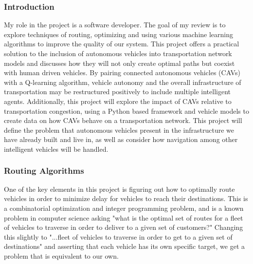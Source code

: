 \documentclass[onecolumn, draftclsnofoot,10pt, compsoc]{IEEEtran}
\begin{document}
\subsubsection{Introduction}
My role in the project is a software developer.
The goal of my review is to explore techniques of routing, optimizing and using various machine learning algorithms to improve the quality of our system.
This project offers a practical solution to the inclusion of autonomous vehicles into transportation network models and discusses how they will not only create optimal paths but coexist with human driven vehicles.
By pairing connected autonomous vehicles (CAVs) with a Q-learning algorithm, vehicle autonomy and the overall infrastructure of transportation may be restructured positively to include multiple intelligent agents.
Additionally, this project will explore the impact of CAVs relative to transportation congestion, using a Python based framework and vehicle models to create data on how CAVs behave on a transportation network.
This project will define the problem that autonomous vehicles present in the infrastructure we have already built and live in, as well as consider how navigation among other intelligent vehicles will be handled.
\subsubsection{Routing Algorithms}
One of the key elements in this project is figuring out how to optimally route vehicles in order to minimize delay for vehicles to reach their destinations.
This is a combinatorial optimization and integer programming problem, and is a known problem in computer science asking "what is the optimal set of routes for a fleet of vehicles to traverse in order to deliver to a given set of customers?"
Changing this slightly to "...fleet of vehicles to traverse in order to get to a given set of destinations" and asserting that each vehicle has its own specific target, we get a problem that is equivalent to our own.
\end{document}

